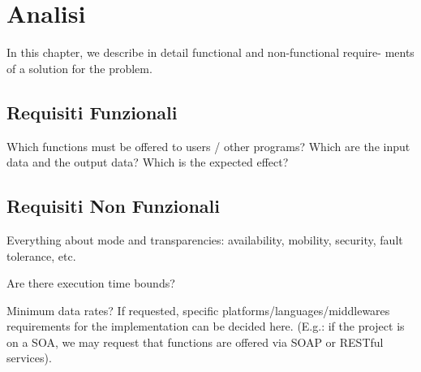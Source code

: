 \chapter{Analisi}
In this chapter, we describe in detail functional and non-functional require-
ments of a solution for the problem.

\section{Requisiti Funzionali}
Which functions must be offered to users / other programs? Which are the input data and the output data? Which is the expected effect?

\section{Requisiti Non Funzionali}
Everything about mode and transparencies: availability, mobility, security, fault tolerance, etc. 

Are there execution time bounds? 

Minimum data rates? If requested, specific platforms/languages/middlewares requirements for the implementation can be decided here. (E.g.: if the project is on a SOA, we may request that functions are offered via SOAP or RESTful services).